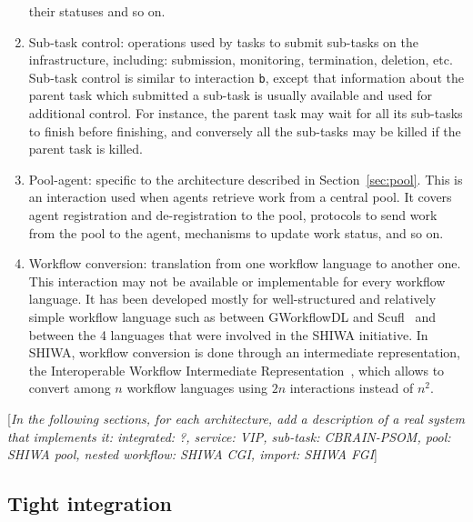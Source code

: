 \documentclass[preprint,3p,twocolumn]{elsarticle}
\newcommand{\todo}[1]{\color{blue}\xspace[\emph{#1}]\xspace\color{black}}
\begin{document}
\begin{enumerate}[leftmargin=0cm,itemindent=0.6cm,label=\texttt{(\alph*)}]
  their statuses and so on. 
\item Sub-task control: operations used by tasks to submit sub-tasks
  on the infrastructure, including: submission, monitoring,
  termination, deletion, etc. Sub-task control is similar to
  interaction \texttt{b}, except that information about the parent
  task which submitted a sub-task is usually available and used for
  additional control. For instance, the parent task may wait for all
  its sub-tasks to finish before finishing, and conversely all the
  sub-tasks may be killed if the parent task is killed.
\item Pool-agent: specific to the architecture described
  in Section~\ref{sec:pool}. This is an interaction used when agents retrieve
  work from a central pool. It covers agent registration and
  de-registration to the pool, protocols to send work from the pool to
  the agent, mechanisms to update work status, and so on. 
\item Workflow conversion: translation from one workflow language to
  another one. This interaction may not be available or implementable
  for every workflow language. It has been developed mostly for
  well-structured and relatively simple workflow language such as between GWorkflowDL
  and Scufl~\cite{OLAB-09} and between the 4 languages that were involved in the
  SHIWA initiative. In SHIWA, workflow conversion is done through an
  intermediate representation, the Interoperable Workflow Intermediate
  Representation~\cite{plankensteiner-montagnat-etal:2011}, which
  allows to convert among $n$ workflow languages using $2n$
  interactions instead of $n^2$.
\end{enumerate}

\todo{In the following sections, for each architecture, add a
  description of a real system that implements it: integrated: ?,
  service: VIP, sub-task: CBRAIN-PSOM, pool: SHIWA pool, nested
  workflow: SHIWA CGI, import: SHIWA FGI}

\subsection{Tight integration}
\end{document}
